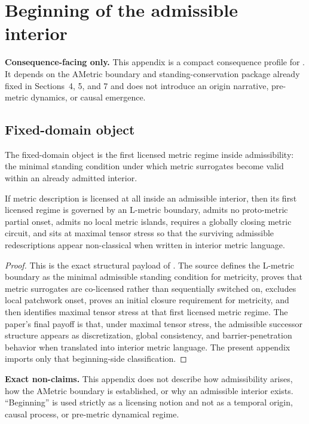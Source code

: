 \section{Beginning of the admissible interior}
\label{app:interior-beginning}

\begin{fixedbox}
\textbf{Consequence-facing only.} This appendix is a compact consequence profile for \beginningdoc{}. It depends on the AMetric boundary and standing-conservation package already fixed in Sections~4, 5, and 7 and does not introduce an origin narrative, pre-metric dynamics, or causal emergence.
\end{fixedbox}

\subsection*{Fixed-domain object}
The fixed-domain object is the first licensed metric regime inside admissibility: the minimal standing condition under which metric surrogates become valid within an already admitted interior.

\begin{proposition}
If metric description is licensed at all inside an admissible interior, then its first licensed regime is governed by an L-metric boundary, admits no proto-metric partial onset, admits no local metric islands, requires a globally closing metric circuit, and sits at maximal tensor stress so that the surviving admissible redescriptions appear non-classical when written in interior metric language.
\end{proposition}

\begin{proof}
This is the exact structural payload of \beginningdoc{}. The source defines the L-metric boundary as the minimal admissible standing condition for metricity, proves that metric surrogates are co-licensed rather than sequentially switched on, excludes local patchwork onset, proves an initial closure requirement for metricity, and then identifies maximal tensor stress at that first licensed metric regime. The paper's final payoff is that, under maximal tensor stress, the admissible successor structure appears as discretization, global consistency, and barrier-penetration behavior when translated into interior metric language. The present appendix imports only that beginning-side classification.\cite{MaleyBeginningInterior}
\end{proof}

\begin{reviewbox}
\textbf{Exact non-claims.} This appendix does not describe how admissibility arises, how the AMetric boundary is established, or why an admissible interior exists. ``Beginning'' is used strictly as a licensing notion and not as a temporal origin, causal process, or pre-metric dynamical regime.\cite{MaleyBeginningInterior}
\end{reviewbox}
